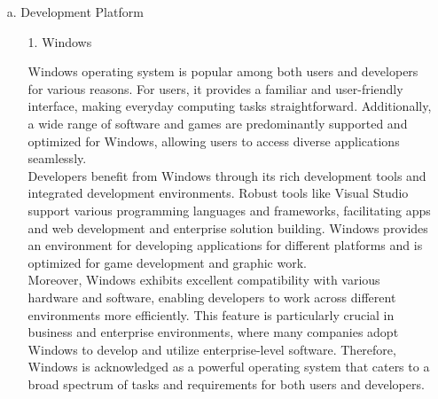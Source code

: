 \documentclass[conference]{IEEEtran}
\begin{document}
\begin{enumerate}
    \item[a.] Development Platform
    
    \begin{enumerate}
    \item[1.] Windows \cite{novac2017comparative} \cite{stallings2005windows}
    \item[] Windows operating system is popular among both users and developers for various reasons. For users, it provides a familiar and user-friendly interface, making everyday computing tasks straightforward. Additionally, a wide range of software and games are predominantly supported and optimized for Windows, allowing users to access diverse applications seamlessly.
    \\
    Developers benefit from Windows through its rich development tools and integrated development environments. Robust tools like Visual Studio support various programming languages and frameworks, facilitating apps and web development and enterprise solution building. Windows provides an environment for developing applications for different platforms and is optimized for game development and graphic work.
    \\
    Moreover, Windows exhibits excellent compatibility with various hardware and software, enabling developers to work across different environments more efficiently. This feature is particularly crucial in business and enterprise environments, where many companies adopt Windows to develop and utilize enterprise-level software. Therefore, Windows is acknowledged as a powerful operating system that caters to a broad spectrum of tasks and requirements for both users and developers. \\


\end{enumerate}
\end{enumerate}
\end{document}
